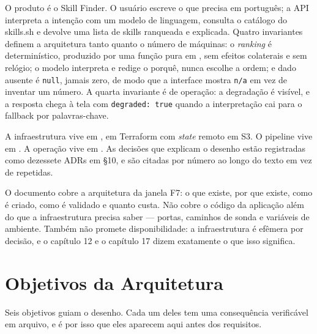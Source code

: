 \documentclass[11pt,a4paper]{article}
\begin{document}
O produto é o Skill Finder. O usuário escreve o que precisa em português; a API interpreta a
intenção com um modelo de linguagem, consulta o catálogo do skills.sh e devolve uma lista de skills
ranqueada e explicada. Quatro invariantes definem a arquitetura tanto quanto o número de
máquinas:
o \emph{ranking} é determinístico, produzido por uma função pura em ,
sem efeitos colaterais e sem relógio; o modelo interpreta e redige o porquê, nunca escolhe a ordem;
e dado ausente é \texttt{null}, jamais zero, de modo que a interface mostra \texttt{n/a} em vez de
inventar um número. A quarta invariante é de operação: a degradação é visível, e a resposta chega
à tela com \texttt{degraded: true} quando a interpretação cai para o fallback por palavras-chave.

A infraestrutura vive em , em Terraform com \emph{state} remoto em S3. O pipeline
vive em . A operação vive em
. As decisões que explicam o desenho estão registradas como
dezessete ADRs em  §10, e são citadas por número ao longo do
texto em vez de repetidas.

O documento cobre a arquitetura da janela F7: o que existe, por que existe, como é criado, como é
validado e quanto custa. Não cobre o código da aplicação além do que a infraestrutura precisa saber
--- portas, caminhos de sonda e variáveis de ambiente. Também não promete disponibilidade: a
infraestrutura é efêmera por decisão, e o capítulo 12 e o capítulo 17 dizem exatamente o que isso
significa.

\section{Objetivos da Arquitetura}

Seis objetivos guiam o desenho. Cada um deles tem uma consequência verificável em arquivo, e é por
isso que eles aparecem aqui antes dos requisitos.
\end{document}
